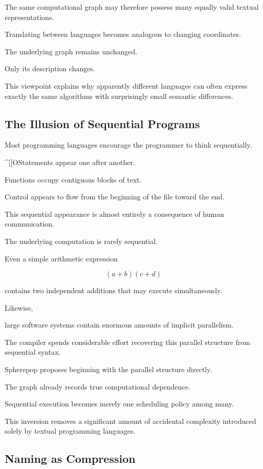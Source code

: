 \documentclass[12pt,oneside]{article}
\begin{document}
The same computational graph may therefore possess many equally valid textual representations.

Translating between languages becomes analogous to changing coordinates.

The underlying graph remains unchanged.

Only its description changes.

This viewpoint explains why apparently different languages can often express exactly the same algorithms with surprisingly small semantic differences.

\subsection{The Illusion of Sequential Programs}

Most programming languages encourage the programmer to think sequentially.

^[[OStatements appear one after another.

Functions occupy contiguous blocks of text.

Control appears to flow from the beginning of the file toward the end.

This sequential appearance is almost entirely a consequence of human communication.

The underlying computation is rarely sequential.

Even a simple arithmetic expression

\[
(a+b)(c+d)
\]

contains two independent additions that may execute simultaneously.

Likewise,

large software systems contain enormous amounts of implicit parallelism.

The compiler spends considerable effort recovering this parallel structure from sequential syntax.

Spherepop proposes beginning with the parallel structure directly.

The graph already records true computational dependence.

Sequential execution becomes merely one scheduling policy among many.

This inversion removes a significant amount of accidental complexity introduced solely by textual programming languages.

\subsection{Naming as Compression}
\end{document}
